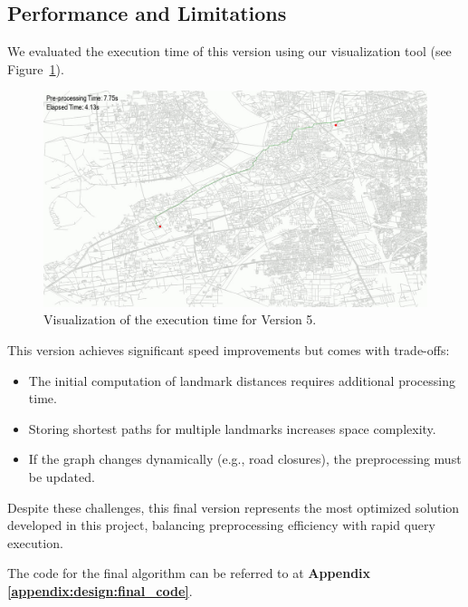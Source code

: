 	\subsection{Performance and Limitations}
	
	We evaluated the execution time of this version using our visualization tool (see Figure~\ref{fig:bidirectional_alt_timing}).
	
	\begin{figure}[h]
		\centering
		\includegraphics[width=1.0\textwidth]{final.png}
		\caption{Visualization of the execution time for Version 5.}
		\label{fig:bidirectional_alt_timing}
	\end{figure}
	
	This version achieves significant speed improvements but comes with trade-offs:
	\begin{itemize}
		\item The initial computation of landmark distances requires additional processing time.
		\item Storing shortest paths for multiple landmarks increases space complexity.
		\item If the graph changes dynamically (e.g., road closures), the preprocessing must be updated.
	\end{itemize}
	
	Despite these challenges, this final version represents the most optimized solution developed in this project, balancing preprocessing efficiency with rapid query execution. \newline
	
	The code for the final algorithm can be referred to at \textbf{Appendix \ref{appendix:design:final_code}}.